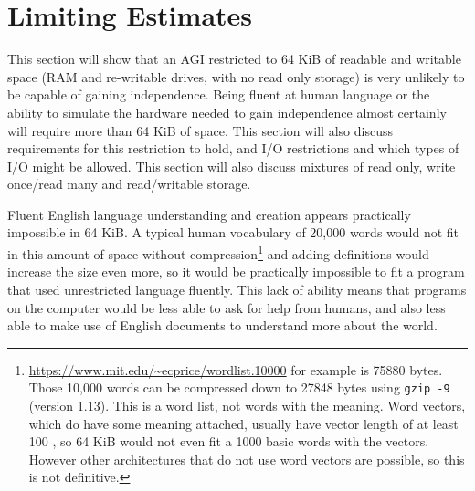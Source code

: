 \documentclass[letterpaper,twocolumn]{article}
\begin{document}

\section{Limiting Estimates}
\label{limitingestsec}

This section will show that an AGI restricted to 64 KiB of readable and
writable space (RAM and re-writable drives, with no read only storage)
is very unlikely to be capable of gaining independence. Being fluent at human
language or the ability to simulate the hardware needed to gain
independence almost certainly will require more than 64 KiB of
space. This section will also discuss requirements for this
restriction to hold, and I/O restrictions and which types of I/O might be
allowed. This section will also discuss mixtures of read only, write
once/read many and read/writable storage.

Fluent English language understanding and creation appears practically
impossible in 64 KiB. A typical human vocabulary of 20,000 words would
not fit in this amount of space without
compression\footnote{\url{https://www.mit.edu/~ecprice/wordlist.10000}
for example is 75880 bytes. Those 10,000 words can be compressed down
to 27848 bytes using {\texttt{gzip -9}} (version 1.13). This is a word
list, not words with the meaning.  Word vectors, which do have some
meaning attached, usually have vector length of at least 100
\citep{pennington-etal-2014-glove}, so 64 KiB would not even fit a
1000 basic words with the vectors. However other architectures that do
not use word vectors are possible, so this is not definitive.} and
adding definitions would increase the size even more, so it would be
practically impossible to fit a program that used unrestricted
language fluently. This lack of ability means that programs on the
computer would be less able to ask for help from humans, and also less
able to make use of English documents to understand more about the
world.
\end{document}
